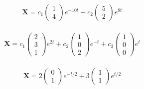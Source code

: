 \documentclass{article}
\begin{document}
\setcounter{subsubsection}{4}
\subsubsection{}

\[\mathbf{X} = c_1 \begin{pmatrix}
    1 \\
    4
  \end{pmatrix} e^{-10 t} + c_2 \begin{pmatrix}
    5 \\
    2
  \end{pmatrix} e^{8 t}\]

\setcounter{subsubsection}{6}
\subsubsection{}

\[\mathbf{X} = c_1 \begin{pmatrix}
    2 \\
    3 \\
    1
  \end{pmatrix} e^{2 t} + c_2 \begin{pmatrix}
    1 \\
    0 \\
    2
  \end{pmatrix} e^{-t} + c_3 \begin{pmatrix}
    1 \\
    0 \\
    0
  \end{pmatrix} e^t\]

\setcounter{subsubsection}{12}
\subsubsection{}

\[\mathbf{X} = 2 \begin{pmatrix}
    0 \\
    1
  \end{pmatrix} e^{-t / 2} + 3 \begin{pmatrix}
    1 \\
    1
  \end{pmatrix} e^{t / 2}\]

\setcounter{subsubsection}{14}
\subsubsection{}
\end{document}
